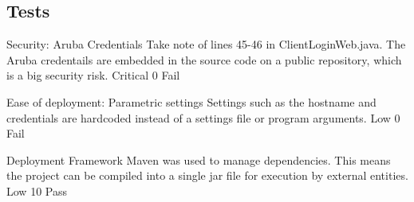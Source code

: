 \subsection{Tests}
\NonFuncReq
{Security: Aruba Credentials}
{Take note of lines 45-46 in ClientLoginWeb.java. The Aruba credentails are embedded in the source code on a public repository, which is a big security risk.}
{Critical}
{0}
{Fail}

{Ease of deployment: Parametric settings}
{Settings such as the hostname and credentials are hardcoded instead of a settings file or program arguments.}
{Low}
{0}
{Fail}

{Deployment Framework}
{Maven was used to manage dependencies. This means the project can be compiled into a single jar file for execution by external entities.}
{Low}
{10}
{Pass}


